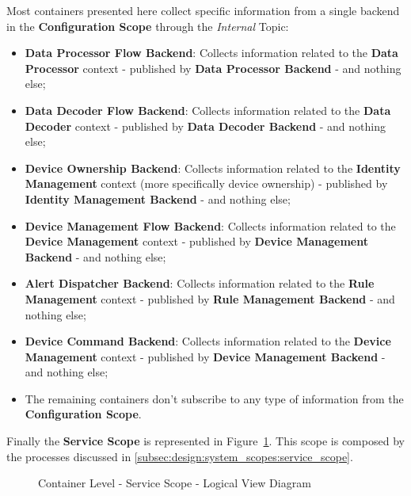 Most containers presented here collect specific information from a single backend in the \textbf{Configuration Scope} through the \textit{Internal} Topic:

\begin{itemize}
   \item \textbf{Data Processor Flow Backend}: Collects information related to the \textbf{Data Processor} context - published by \textbf{Data Processor Backend} - and nothing else;
   \item \textbf{Data Decoder Flow Backend}: Collects information related to the \textbf{Data Decoder} context - published by \textbf{Data Decoder Backend} - and nothing else;
   \item \textbf{Device Ownership Backend}: Collects information related to the \textbf{Identity Management} context (more specifically device ownership) - published by \textbf{Identity Management Backend} - and nothing else;
   \item \textbf{Device Management Flow Backend}: Collects information related to the \textbf{Device Management} context - published by \textbf{Device Management Backend} - and nothing else;
   \item \textbf{Alert Dispatcher Backend}: Collects information related to the \textbf{Rule Management} context - published by \textbf{Rule Management Backend} - and nothing else;
   \item \textbf{Device Command Backend}: Collects information related to the \textbf{Device Management} context - published by \textbf{Device Management Backend} - and nothing else;
   \item The remaining containers don't subscribe to any type of information from the \textbf{Configuration Scope}.
\end{itemize}

Finally the \textbf{Service Scope} is represented in Figure~\ref{fig:design:architecture:container:logical:diagram:service}. This scope is composed by the processes discussed in \ref{subsec:design:system_scopes:service_scope}.

\begin{figure}[H]
   \centering
   \resizebox{\columnwidth}{!}
   {      
      
   }
   \caption[Container Level - Service Scope - Logical View Diagram]{Container Level - Service Scope - Logical View Diagram}
   \label{fig:design:architecture:container:logical:diagram:service}
\end{figure}

